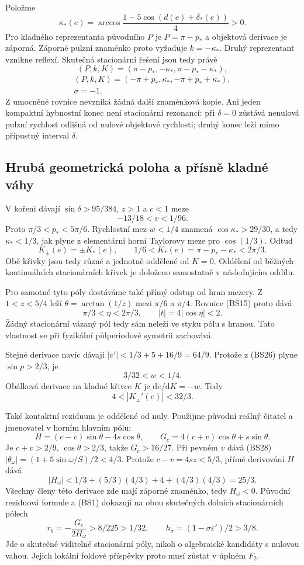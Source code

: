 \documentclass[11pt,a4paper]{article}
\theoremstyle{remark}\newtheorem{remark}[theorem]{Poznámka}
\numberwithin{equation}{section}
\begin{document}
Položme
\[
\kappa_*(e)=\arccos
\frac{1-5\cos(d(e)+\delta_*(e))}{4}>0.
\]
Pro kladného reprezentanta původního \(P\) je \(P=\pi-p_*\)
a objektová derivace je záporná. Záporné pulzní znaménko proto
vyžaduje \(k=-\kappa_*\). Druhý reprezentant vznikne reflexí.
Skutečná stacionární řešení jsou tedy právě
\[
\boxed{(P,k,K)=(\pi-p_*,-\kappa_*,\pi-p_*-\kappa_*),}
\]
\[
\boxed{\begin{gathered}
(P,k,K)=(-\pi+p_*,\kappa_*,-\pi+p_*+\kappa_*),\\
\sigma=-1.
\end{gathered}}
\tag{BS25}
\]
Z umocněné rovnice nevzniká žádná další znaménková kopie. Ani jeden
kompaktní hybnostní konec není stacionární rezonancí: při
\(\delta=0\) zůstává nenulová pulzní rychlost odlišná od nulové
objektové rychlosti; druhý konec leží mimo přípustný interval
\(\delta\).

\subsection{Hrubá geometrická poloha a přísně kladné váhy}

V kořeni dávají \(\sin\delta>95/384\), \(z>1\) a \(c<1\)
meze
\[
-13/18<v<1/96.
\tag{BS26}
\]
Proto \(\pi/3<p_*<5\pi/6\). Rychlostní mez \(w<1/4\) znamená
\(\cos\kappa_*>29/30\), a tedy \(\kappa_*<1/3\), jak plyne
z elementární horní Taylorovy meze pro \(\cos(1/3)\). Odtud
\[
\boxed{K_\pm(e)=\pm K_*(e),\qquad
1/6<K_*(e)=\pi-p_*-\kappa_*<2\pi/3.}
\tag{BS27}
\]
Obě křivky jsou tedy různé a jednotně oddělené od \(K=0\).
Oddělení od běžných kontinuálních stacionárních křivek je
doloženo samostatně v následujícím oddílu.

Pro samotné tyto póly dostáváme také přímý odstup od hran mezery.
Z \(1<z<5/4\) leží \(\theta=\arctan(1/z)\) mezi \(\pi/6\)
a \(\pi/4\). Rovnice (BS15) proto dává
\[
\pi/3<\eta<2\pi/3,
\qquad \boxed{|t|=4|\cos\eta|<2.}
\tag{BS28}
\]
Žádný stacionární vázaný pól tedy sám neleží ve styku pólu
s hranou. Tato vlastnost se při fyzikální půlperiodové symetrii
zachovává.

Stejné derivace navíc dávají
\(|v'|<1/3+5+16/9=64/9\). Protože z (BS26) plyne
\(\sin p>2/3\), je
\[
\boxed{3/32<w<1/4.}
\tag{BS29}
\]
Obálková derivace na kladné křivce \(K\) je \(\mathrm de/\mathrm dK=-w\).
Tedy
\[
\boxed{4<|K_\pm'(e)|<32/3.}
\tag{BS30}
\]

Také kontaktní reziduum je oddělené od nuly. Použijme původní
reálný čitatel a jmenovatel v horním hlavním pólu:
\[
H=(c-v)\sin\theta-4s\cos\theta,
\qquad G_c=4(c+v)\cos\theta+s\sin\theta.
\]
Je \(c+v>2/9\), \(\cos\theta>2/3\), takže \(G_c>16/27\).
Při pevném \(v\) dává (BS28)
\(\lvert\theta_\omega\rvert=(1+5\sin\omega/S)/2<4/3\).
Protože \(c-v=4sz<5/3\), přímé derivování \(H\) dává
\[
|H_\omega|<1/3+(5/3)(4/3)+4+(4/3)(4/3)=25/3.
\]
Všechny členy této derivace zde mají záporné znaménko, tedy
\(H_\omega<0\). Původní reziduová formule a (BS1) dokazují
na obou skutečných dolních stacionárních pólech
\[
\boxed{r_b=-\frac{G_c}{2H_\omega}>8/225>1/32,
\qquad h_\sigma=(1-\sigma\varepsilon')/2>3/8.}
\tag{BS31}
\]
Jde o skutečné viditelné stacionární póly, nikoli o algebraické
kandidáty s nulovou vahou. Jejich lokální foldové příspěvky proto
musí zůstat v úplném \(F_2\).
\end{document}
